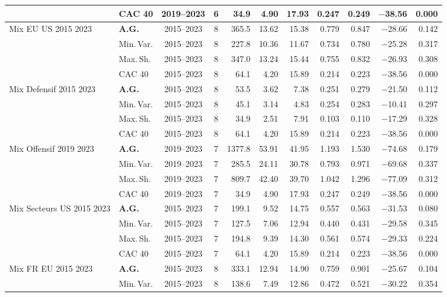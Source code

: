 \begin{longtable}{p{2.6cm} l c c r r r r r r r}
 & CAC 40 & 2019--2023 & 6 & 34.9 & 4.90 & 17.93 & 0.247 & 0.249 & $-$38.56 & 0.000 \\
\midrule
Mix EU US 2015 2023 & \textbf{A.G.} & 2015--2023 & 8 & 365.5 & 13.62 & 15.38 & 0.779 & 0.847 & $-$28.66 & 0.142 \\
 & Min.\,Var. & 2015--2023 & 8 & 227.8 & 10.36 & 11.67 & 0.734 & 0.780 & $-$25.28 & 0.317 \\
 & Max.\,Sh. & 2015--2023 & 8 & 347.0 & 13.24 & 15.44 & 0.755 & 0.832 & $-$26.93 & 0.308 \\
 & CAC 40 & 2015--2023 & 8 & 64.1 & 4.20 & 15.89 & 0.214 & 0.223 & $-$38.56 & 0.000 \\
\midrule
Mix Defensif 2015 2023 & \textbf{A.G.} & 2015--2023 & 8 & 53.5 & 3.62 & 7.38 & 0.251 & 0.279 & $-$21.50 & 0.112 \\
 & Min.\,Var. & 2015--2023 & 8 & 45.1 & 3.14 & 4.83 & 0.254 & 0.283 & $-$10.41 & 0.297 \\
 & Max.\,Sh. & 2015--2023 & 8 & 34.9 & 2.51 & 7.91 & 0.103 & 0.110 & $-$17.29 & 0.328 \\
 & CAC 40 & 2015--2023 & 8 & 64.1 & 4.20 & 15.89 & 0.214 & 0.223 & $-$38.56 & 0.000 \\
\midrule
Mix Offensif 2019 2023 & \textbf{A.G.} & 2019--2023 & 7 & 1377.8 & 53.91 & 41.95 & 1.193 & 1.530 & $-$74.68 & 0.179 \\
 & Min.\,Var. & 2019--2023 & 7 & 285.5 & 24.11 & 30.78 & 0.793 & 0.971 & $-$69.68 & 0.337 \\
 & Max.\,Sh. & 2019--2023 & 7 & 809.7 & 42.40 & 39.70 & 1.042 & 1.296 & $-$77.09 & 0.312 \\
 & CAC 40 & 2019--2023 & 7 & 34.9 & 4.90 & 17.93 & 0.247 & 0.249 & $-$38.56 & 0.000 \\
\midrule
Mix Secteurs US 2015 2023 & \textbf{A.G.} & 2015--2023 & 7 & 199.1 & 9.52 & 14.75 & 0.557 & 0.563 & $-$31.53 & 0.080 \\
 & Min.\,Var. & 2015--2023 & 7 & 127.5 & 7.06 & 12.94 & 0.440 & 0.431 & $-$29.58 & 0.345 \\
 & Max.\,Sh. & 2015--2023 & 7 & 194.8 & 9.39 & 14.30 & 0.561 & 0.574 & $-$29.33 & 0.224 \\
 & CAC 40 & 2015--2023 & 7 & 64.1 & 4.20 & 15.89 & 0.214 & 0.223 & $-$38.56 & 0.000 \\
\midrule
Mix FR EU 2015 2023 & \textbf{A.G.} & 2015--2023 & 8 & 333.1 & 12.94 & 14.90 & 0.759 & 0.901 & $-$25.67 & 0.104 \\
 & Min.\,Var. & 2015--2023 & 8 & 138.6 & 7.49 & 12.86 & 0.472 & 0.521 & $-$30.22 & 0.354 \\

\end{longtable}
